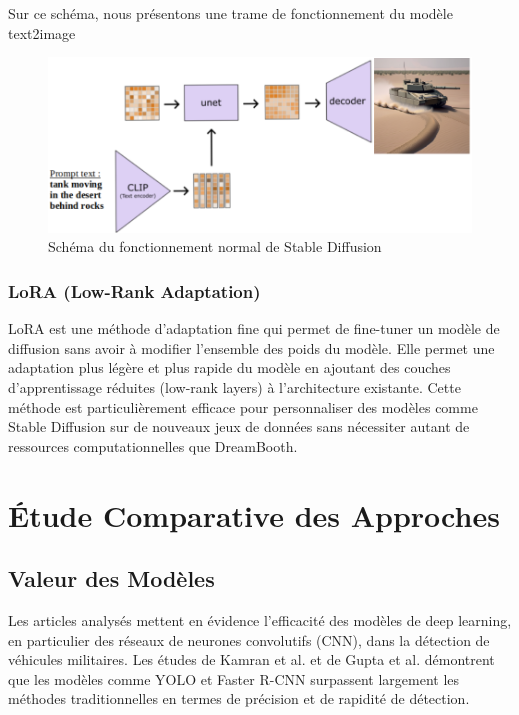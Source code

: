 Sur ce schéma, nous présentons une trame de fonctionnement du modèle text2image
\begin{figure}[H]
    \center
    \includegraphics[width=\textwidth]{./images/shema_sd.png}
    \caption{Schéma du fonctionnement normal de Stable Diffusion}
\end{figure}


\subsubsection{LoRA (Low-Rank Adaptation)}
LoRA est une méthode d'adaptation fine qui permet de fine-tuner un modèle de diffusion sans avoir à modifier l'ensemble des poids du modèle.
Elle permet une adaptation plus légère et plus rapide du modèle en ajoutant des couches d'apprentissage réduites (low-rank layers) à l'architecture existante.
Cette méthode est particulièrement efficace pour personnaliser des modèles comme Stable Diffusion sur de nouveaux jeux de données sans nécessiter autant de ressources computationnelles que DreamBooth.


\section{Étude Comparative des Approches}

\subsection{Valeur des Modèles}

Les articles analysés mettent en évidence l'efficacité des modèles de deep learning, en particulier des réseaux de neurones convolutifs (CNN), dans la détection de véhicules militaires. Les études de Kamran et al. \cite{kamran2020} et de Gupta et al. \cite{gupta2021} démontrent que les modèles comme YOLO et Faster R-CNN surpassent largement les méthodes traditionnelles en termes de précision et de rapidité de détection.

